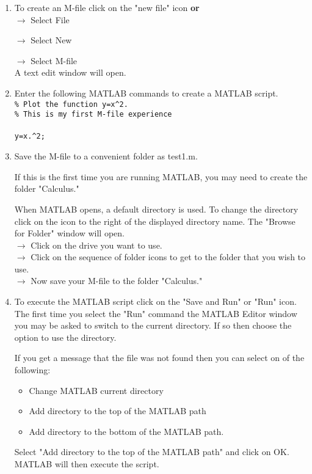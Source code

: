 \begin{enumerate}
  \item To create an M-file click on the "new file" icon \textbf{or}\\
  $\rightarrow$ Select File
  
  \hspace{.2in}$\rightarrow$  Select New 
  
  \hspace{.4in}$\rightarrow$  Select M-file\\
  A text edit window will open.
  
  \item Enter the following MATLAB commands to create a MATLAB script.\\
  \verb!% Plot the function y=x^2.!\\
  \verb!% This is my first M-file experience!\\
  \\
  \verb!y=x.^2;!\\
  
  \item Save the M-file to a convenient folder as test1.m.
  
  If this is the first time you are running MATLAB, you may need to create the
  folder "Calculus."
  
  When MATLAB opens, a default directory is used.  To change the
  directory click on the icon to the right of the displayed directory
  name.  The "Browse for Folder"
  window will open.\\
  $\rightarrow$ Click on the drive you want to use.\\
  $\rightarrow$ Click on the sequence of folder icons to get to the
  folder that you wish to use.\\
  $\rightarrow$ Now save your M-file to the folder "Calculus."
  
  \item To execute the MATLAB script click on the "Save and Run" or "Run" icon. 
  The first time you select the "Run" command the MATLAB Editor window
  you may be asked to switch to the current directory. If so then
  choose the option to use the directory.
  
  If you get a message that the file was not found then you can select
  on of the following:
  \begin{itemize}
    \item Change MATLAB current directory
    \item Add directory to the top of the MATLAB path
    \item Add directory to the bottom of the MATLAB path.
  \end{itemize}
  Select "Add directory to the top of the MATLAB path" and click on
  OK.  MATLAB will then execute the script.


\end{enumerate}
